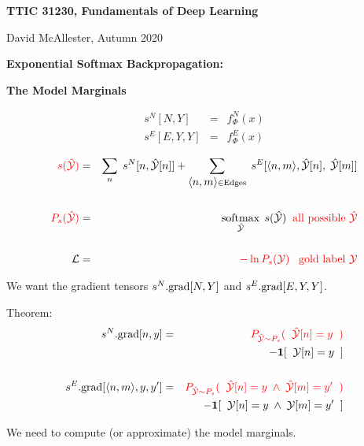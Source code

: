 




{\Huge

  \centerline{\bf TTIC 31230, Fundamentals of Deep Learning}
  \bigskip
  \centerline{David McAllester, Autumn 2020}
  \vfill
  \vfill
  \centerline{\bf Exponential Softmax Backpropagation:}
  \vfill
  \centerline{\bf The Model Marginals}
\vfill
\vfill
\vfill


\begin{eqnarray*}
s^N[N,Y] & = & f^N_\Phi(x) \\
s^E[E,Y,Y] & = & f^E_\Phi(x)
\end{eqnarray*}

\vfill
\begin{eqnarray*}
{\color{red} s(\hat{\cal Y})} & = & \sum_n\;s^N[n,\hat{\cal Y}[n]] + \sum_{{\mbox{$\langle n,m\rangle$}} \in \mathrm{Edges}}\;s^E[{\mbox{$\langle n,m\rangle$}},\hat{\cal Y}[n],\;\hat{\cal Y}[m]] \\
\\
{\color{red} P_s(\hat{\cal Y})} & = & \operatorname*{softmax}_{\hat{\cal Y}}\;s(\hat{\cal Y}) \;\;\mbox{\color{red} all possible $\hat{\cal Y}$} \\
\\
{\cal L} & = & {\color{red} - \ln P_s({\cal Y}) \;\;\;\mbox{gold label ${\cal Y}$}}
\end{eqnarray*}

\vfill
We want the gradient tensors {\color{red} $s^N.\mathrm{grad}[N,Y]$} and {\color{red} $s^E.\mathrm{grad}[E,Y,Y]$}.



Theorem:
\begin{eqnarray*}
    s^N.\mathrm{grad}[n,y] & = &  {\color{red} P_{\hat{\cal Y} \sim P_s}(\;\;\hat{\cal Y}[n] = y\;\;)} \\
    & & \;\;\;\;\;- \mathbf{1}[\;\;{\cal Y}[n] = y\;\;] \\
    \\
    s^E.\mathrm{grad}[{\mbox{$\langle n,m\rangle$}},y,y'] & = &  {\color{red} P_{\hat{\cal Y} \sim P_s}(\;\;\hat{\cal Y}[n] = y \; \wedge \; \hat{\cal Y}[m] = y'\;\;)} \\
    & & \;\;\;\;\;- \mathbf{1}[\;\;{\cal Y}[n] = y\; \wedge \; {\cal Y}[m] = y'\;\;]
\end{eqnarray*}

\vfill
We need to compute (or approximate) the model marginals.


}
